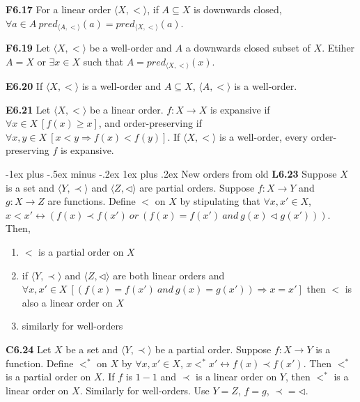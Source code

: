 \documentclass[10pt, landscape]{article}
\makeatletter
\renewcommand{\subsection}{\@startsection{subsection}{3}{0mm}%
                                {-1ex plus -.5ex minus -.2ex}%
                                {1ex plus .2ex}%
                                {\normalfont\small\bfseries}}%
\makeatother
\begin{document}
\begin{multicols*}{3}
\textbf{F6.17} For a linear order $\langle X, < \rangle$, if $A \subseteq X$ is downwards closed, $\forall a \in A \ pred_{\langle A, < \rangle}(a)=pred_{\langle X, < \rangle}(a)$.

\textbf{F6.19} Let $\langle X, < \rangle$ be a well-order and $A$ a downwards closed subset of $X$. Etiher $A=X$ or $\exists x \in X$ such that $A = pred_{\langle X, < \rangle}(x)$.

\textbf{E6.20} If $\langle X, < \rangle$ is a well-order and $A \subseteq X$, $\langle A, < \rangle$ is a well-order.

\textbf{E6.21} Let $\langle X, < \rangle$ be a linear order. $f: X \rightarrow X$ is expansive if $\forall x \in X\ [f(x) \geq x]$, and order-preserving if $\forall x, y \in X \ [x < y \Rightarrow f(x) < f(y)]$. If $\langle X, < \rangle$ is a well-order, every order-preserving $f$ is expansive.


\subsection{New orders from old}
\textbf{L6.23} Suppose $X$ is a set and $\langle Y, \prec \rangle$ and $\langle Z, \lhd \rangle$ are partial orders. Suppose $f: X \rightarrow Y$ and $g : X \rightarrow Z$ are functions. Define $<$ on $X$ by stipulating that $\forall x, x' \in X$, $x < x' \leftrightarrow (f(x) \prec f(x')\ or \ (f(x) = f(x') \ and \ g(x) \lhd g(x')))$. Then,
\begin{enumerate}
    \item $<$ is a partial order on $X$
    \item if $\langle Y, \prec \rangle$ and $\langle Z, \lhd \rangle$ are both linear orders and $\forall x, x' \in X \ [(f(x) = f(x') \ and \ g(x) = g(x')) \Rightarrow x = x']$ then $<$ is also a linear order on $X$
    \item similarly for well-orders
\end{enumerate}

\textbf{C6.24} Let $X$ be a set and $\langle Y, \prec \rangle$ be a partial order. Suppose $f: X \rightarrow Y$ is a function. Define $<^*$ on $X$ by $\forall x, x' \in X$, $x <^* x' \leftrightarrow f(x) \prec f(x')$. Then $<^*$ is a partial order on $X$. If $f$ is $1-1$ and $\prec$ is a linear order on $Y$, then $<^*$ is a linear order on $X$. Similarly for well-orders. Use $Y = Z$, $f = g$, $\prec=\lhd$.


\end{multicols*}
\end{document}
